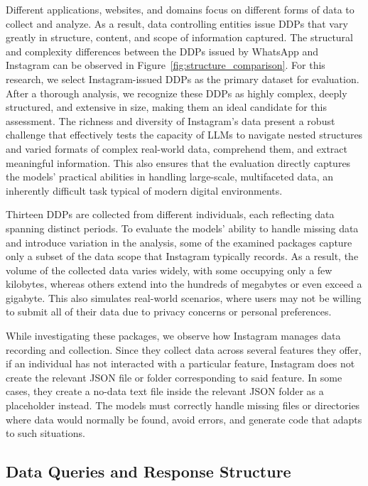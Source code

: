 \documentclass{DESSThesis}
\begin{document}
Different applications, websites, and domains focus on different forms of data to collect and analyze. As a result, data controlling entities issue DDPs that vary greatly in structure, content, and scope of information captured. The structural and complexity differences between the DDPs issued by WhatsApp and Instagram can be observed in Figure~\ref{fig:structure_comparison}. For this research, we select Instagram-issued DDPs as the primary dataset for evaluation. After a thorough analysis, we recognize these DDPs as highly complex, deeply structured, and extensive in size, making them an ideal candidate for this assessment. The richness and diversity of Instagram's data present a robust challenge that effectively tests the capacity of LLMs to navigate nested structures and varied formats of complex real-world data, comprehend them, and extract meaningful information. This also ensures that the evaluation directly captures the models' practical abilities in handling large-scale, multifaceted data, an inherently difficult task typical of modern digital environments.

Thirteen DDPs are collected from different individuals, each reflecting data spanning distinct periods. To evaluate the models' ability to handle missing data and introduce variation in the analysis, some of the examined packages capture only a subset of the data scope that Instagram typically records. As a result, the volume of the collected data varies widely, with some occupying only a few kilobytes, whereas others extend into the hundreds of megabytes or even exceed a gigabyte. This also simulates real-world scenarios, where users may not be willing to submit all of their data due to privacy concerns or personal preferences. 

While investigating these packages, we observe how Instagram manages data recording and collection. Since they collect data across several features they offer, if an individual has not interacted with a particular feature, Instagram does not create the relevant JSON file or folder corresponding to said feature. In some cases, they create a no-data text file inside the relevant JSON folder as a placeholder instead. The models must correctly handle missing files or directories where data would normally be found, avoid errors, and generate code that adapts to such situations.

\subsection{Data Queries and Response Structure}
\end{document}
